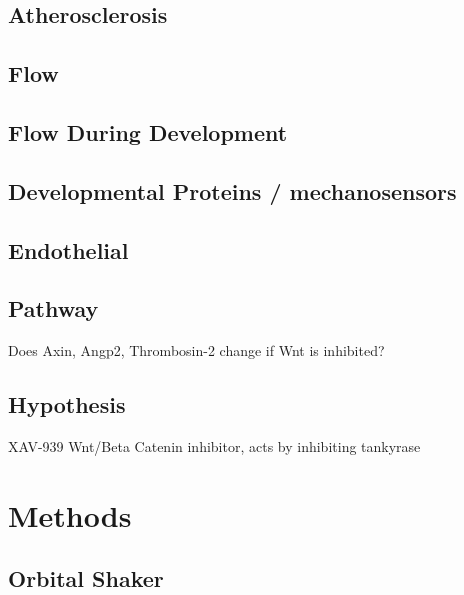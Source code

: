 \documentclass[
  12pt,
]{article}
\begin{document}
\hypertarget{atherosclerosis}{%
\subsection{Atherosclerosis}\label{atherosclerosis}}

\hypertarget{flow}{%
\subsection{Flow}\label{flow}}

\hypertarget{flow-during-development}{%
\subsection{Flow During Development}\label{flow-during-development}}

\hypertarget{developmental-proteins-mechanosensors}{%
\subsection{Developmental Proteins / mechanosensors}\label{developmental-proteins-mechanosensors}}

\hypertarget{endothelial}{%
\subsection{Endothelial}\label{endothelial}}

\hypertarget{pathway}{%
\subsection{Pathway}\label{pathway}}

Does Axin, Angp2, Thrombosin-2 change if Wnt is inhibited?

\hypertarget{hypothesis}{%
\subsection{Hypothesis}\label{hypothesis}}

XAV-939 Wnt/Beta Catenin inhibitor, acts by inhibiting tankyrase

\hypertarget{methods}{%
\section{Methods}\label{methods}}

\hypertarget{orbital-shaker}{%
\subsection{Orbital Shaker}\label{orbital-shaker}}
\end{document}
